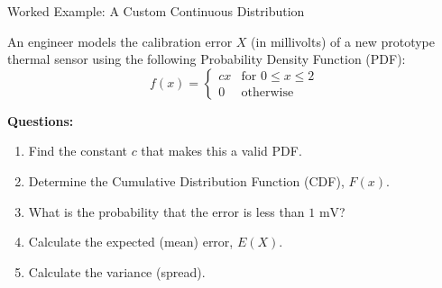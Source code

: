 \begin{frame}{Worked Example: A Custom Continuous Distribution}
    
    \def\boxwidth{\textwidth} %
    \mode<beamer>{\def\boxwidth{0.85\textwidth}} %
    
    \begin{example}
        \begin{minipage}{\boxwidth}
            An engineer models the calibration error $X$ (in millivolts) of a new prototype thermal sensor using the following Probability Density Function (PDF):
            \[
            f(x) = \begin{cases} 
            cx & \text{for } 0 \leq x \leq 2 \\
            0 & \text{otherwise}
            \end{cases}
            \]
            
            \textbf{Questions:}
            \begin{enumerate}
                \item Find the constant $c$ that makes this a valid PDF.
                \item Determine the Cumulative Distribution Function (CDF), $F(x)$.
                \item What is the probability that the error is less than $1\text{ mV}$?
                \item Calculate the expected (mean) error, $E(X)$.
                \item Calculate the variance (spread).
            \end{enumerate}
        \end{minipage}%
    \end{example}
\end{frame}

